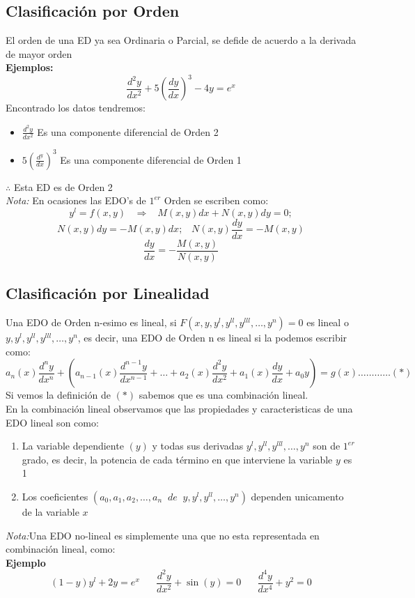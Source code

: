 \documentclass[10pt,executivepaper]{article}
\begin{document}
\subsection{Clasificación por Orden}
El orden de una ED ya sea Ordinaria o Parcial, se defide de acuerdo a la derivada de mayor orden\\
\textbf{Ejemplos:}
\[\frac{d^{2}y}{dx^{2}}+5\left(\frac{dy}{dx}\right)^{3}-4y=e^{x}\]
Encontrado los datos tendremos:
\begin{itemize}
  \item $\frac{d^{2}y}{dx^{2}}$ Es una componente diferencial de Orden 2
  \item $5\left(\frac{d^y}{dx}\right)^{3}$ Es una componente diferencial de Orden 1
\end{itemize}
$\therefore$ Esta ED es de Orden 2\\
\textit{Nota:} En ocasiones las EDO's de $1^{er}$ Orden se escriben como:
\[y^{l}=f(x,y) \;\;\;\Rightarrow\;\;\; M(x,y)dx+N(x,y)dy=0;\]
\[N(x,y)dy=-M(x,y)dx;\;\;\;N(x,y)\frac{dy}{dx}=-M(x,y)\]
\[\frac{dy}{dx}=-\frac{M(x,y)}{N(x,y)}\]

\subsection{Clasificación por Linealidad}
Una EDO de Orden n-esimo es lineal, si $F(x,y,y^{l},y^{ll},y^{lll},\ldots,y^{n})=0$ es lineal o $y,y^{l},y^{ll},y^{lll},\ldots,y^{n}$, es decir, una EDO de Orden n es lineal si la podemos escribir como:
\[a_{n}(x)\frac{d^{n}y}{dx^{n}}+\left( a_{n-1}(x)\frac{d^{n-1}y}{dx^{n-1}}+\ldots+a_{2}(x)\frac{d^{2}y}{dx^{2}}+a_{1}(x)\frac{dy}{dx}+a_{0}y\right)=g(x)\ldots\ldots\ldots\ldots(*)\]
Si vemos la definición de $(*)$ sabemos que es una combinación lineal.\\
En la combinación lineal observamos que las propiedades y caracteristicas de una EDO lineal son como:
\begin{enumerate}
  \item La variable dependiente $(y)$ y todas sus derivadas $y^{l},y^{ll},y^{lll},\ldots,y^{n}$ son de $1^{er}$ grado, es decir, la potencia de cada término en que interviene la variable $y$ es 1
  \item Los coeficientes $\left(a_{0},a_{1},a_{2},\ldots,a_{n}\;\;de\;\;y,y^{l},y^{ll},\ldots,y^{n}\right)$ dependen unicamento de la variable $x$
\end{enumerate}
\textit{Nota:}Una EDO no-lineal es simplemente una que no esta representada en combinación lineal, como:\\
\textbf{Ejemplo}
\[(1-y)y^{l}+2y=e^{x}\;\;\;\;\;\;\frac{d^{2}y}{dx^{2}}+\sin(y)=0\;\;\;\;\;\;\frac{d^{4}y}{dx^{4}}+y^{2}=0\]
\clearpage
\end{document}
